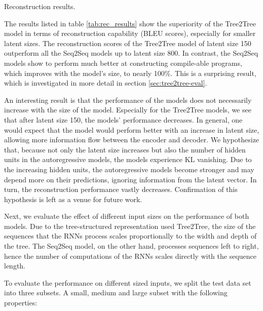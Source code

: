 \begin{table}
\centering

\caption{Reconstruction results.}
\label{tab:rec_results}
\end{table}

The results listed in table \ref{tab:rec_results} show the superiority of the Tree2Tree model in terms of reconstruction capability (BLEU scores), especially for smaller latent sizes. The reconstruction scores of the Tree2Tree model of latent size 150 outperform all the Seq2Seq models up to latent size 800. In contrast, the Seq2Seq models show to perform much better at constructing compile-able programs, which improves with the model's size, to nearly 100\%. This is a surprising result, which is investigated in more detail in section \ref{sec:tree2tree-eval}.

 


An interesting result is that the performance of the models does not necessarily increase with the size of the model. Especially for the Tree2Tree models, we see that after latent size 150, the models' performance decreases. In general, one would expect that the model would perform better with an increase in latent size, allowing more information flow between the encoder and decoder. We hypothesize that, because not only the latent size increases but also the number of hidden units in the autoregressive models, the models experience KL vanishing. Due to the increasing hidden units, the autoregressive models become stronger and may depend more on their predictions, ignoring information from the latent vector. In turn, the reconstruction performance vastly decreases. Confirmation of this hypothesis is left as a venue for future work.



Next, we evaluate the effect of different input sizes on the performance of both models. Due to the tree-structured representation used Tree2Tree, the size of the sequences that the RNNs process scales proportionally to the width and depth of the tree. The Seq2Seq model, on the other hand, processes sequences left to right, hence the number of computations of the RNNs scales directly with the sequence length. 



To evaluate the performance on different sized inputs, we split the test data set into three subsets. A small, medium and large subset with the following properties:

